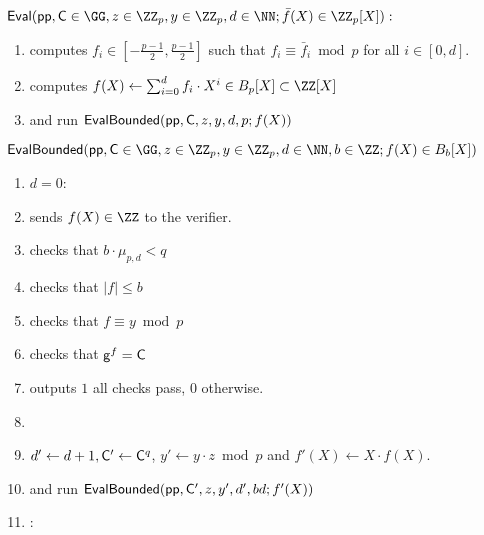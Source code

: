 \documentclass{article}
\theoremstyle{definition}
\begin{document}
\begin{mdframed}
\begin{minipage}{\textwidth}
			$\pro{Eval}(\crs, \gr{C}\in \GG, z\in \ZZ_p, y\in \ZZ_p, d \in \NN; \bar{f}(X)\in \ZZ_p[X]) :$ 
			\begin{enumerate}[nolistsep]
			\item \prover computes $f_i \in [-\frac{p-1}{2},\frac{p-1}{2}]$ such that $f_i\equiv \bar{f}_i\bmod p$ for all $i\in[0,d]$.
			\item \prover computes $f(X)\gets \sum_{i=0}^d f_i \cdot X^{i}\in B_p[X]\subset \ZZ[X]$
			\item \prover and \verifier run $\textsf{{EvalBounded}}(\textsf{pp},\mathsf{C},z,y,d,p;f(X))$
		    \end{enumerate}
		    		\vspace{1em}
		$\pro{EvalBounded}(\crs,\gr{C}\in \GG,z\in \ZZ_p,y\in \ZZ_p,d\in \NN,b\in \ZZ;f(X)\in B_{b}[X])$		
	    \begin{enumerate}[nolistsep]
        \item \pcif $d=0$:
        \item \label{line:basestart}\pcind[1] \prover sends $f(X)\in \ZZ$ to the verifier. 
        \item \pcind[1] \verifier checks that $b\cdot \mu_{p,d} < q$
        \item \pcind[1] \verifier checks that $|f|\leq b$
          \item \pcind[1] \verifier checks that $f\equiv y \bmod p$
                \item \label{line:baseend}\pcind[1] \verifier checks that $\mathsf{g}^{f}=\mathsf{C}$
\item \pcind[1] \verifier outputs $1$ \pcif all checks pass, $0$ otherwise.
          \item {}
         \item \pcind[1]  $d'\gets d+1, \mathsf{C}'\gets \mathsf{C}^q$, $y'\gets y\cdot z \bmod p$ and $f'(X)\gets X \cdot f(X)$.
         \item \pcind[1] \prover and \verifier run $\textsf{{EvalBounded}}(\textsf{pp},\mathsf{C}',z,y',d',bd;f'(X))$

        \item \pcelse: 
       

\end{enumerate}
\end{minipage}
\end{mdframed}
\end{document}
